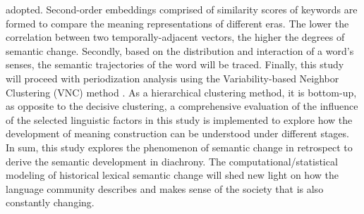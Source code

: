 adopted. Second-order embeddings comprised of similarity scores of keywords are formed to compare the meaning representations of different eras. The lower the correlation between two temporally-adjacent vectors, the higher the degrees of semantic change. Secondly, based on the distribution and interaction of a word's senses, the semantic trajectories of the word will be traced. Finally, this study will proceed with periodization analysis using the Variability-based Neighbor Clustering (VNC) method \parencite{gries2012variability}. As a hierarchical clustering method, it is bottom-up, as opposite to the decisive clustering, a comprehensive evaluation of the influence of the selected linguistic factors in this study is implemented to explore how the development of meaning construction can be understood under different stages. In sum, this study explores the phenomenon of semantic change in retrospect to derive the semantic development in diachrony. The computational/statistical modeling of historical lexical semantic change will shed new light on how the language community describes and makes sense of the society that is also constantly changing.


